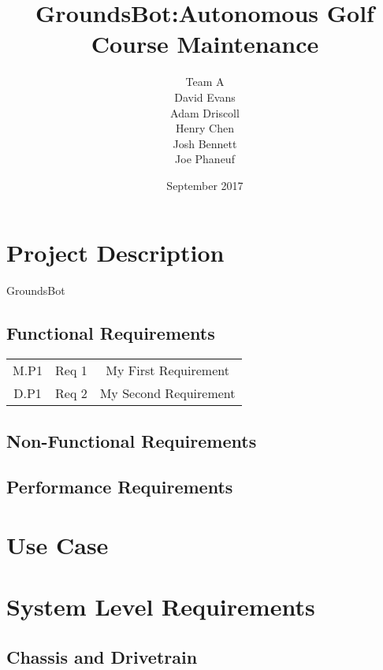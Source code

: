 \documentclass{article}
\begin{document}
\title{GroundsBot:Autonomous Golf Course Maintenance}
\date{September 2017}
\author{Team A        \\ David Evans \\
        Adam Driscoll \\ Henry Chen  \\
        Josh Bennett  \\ Joe Phaneuf \\ }
\maketitle
\newpage

\tableofcontents
\newpage

\section{Project Description}
GroundsBot \\
\subsection{Functional Requirements}
\begin{center}
\begin{tabular}{ |c|c|c| }
  \hline
    M.P1 & Req 1 & My First Requirement \\
    D.P1 & Req 2 & My Second Requirement \\
  \hline
\end{tabular}
\end{center}

\subsection{Non-Functional Requirements}

\subsection{Performance Requirements}

\section{Use Case}

\section{System Level Requirements}
\subsection{Chassis and Drivetrain}
\end{document}
